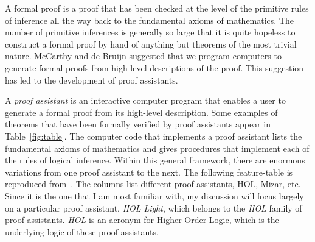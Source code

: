\documentclass{llncs}
\begin{document}
A formal proof is a proof that has been checked at the level of the
primitive rules of inference all the way back to the fundamental
axioms of mathematics.  The number of primitive inferences is
generally so large that it is quite hopeless to construct a formal
proof by hand of anything but theorems of the most trivial nature.
McCarthy and de Bruijn suggested that we program computers to generate
formal proofs from high-level descriptions of the proof.  This
suggestion has led to the development of proof assistants.


A {\it proof assistant} is an interactive computer program that enables a user to
generate a formal proof from its high-level description. 
Some examples of theorems that have been formally verified by proof assistants appear
in Table~\ref{fig:table}.
 The computer code
that implements a proof assistant lists the fundamental axioms
of mathematics and gives procedures that implement each of the rules of logical
inference.  Within this general framework, there are enormous variations
from one proof assistant to the next. The following feature-table is
reproduced from~\cite{wiedijk:17}.  The columns list different proof
assistants, HOL, Mizar, etc.  Since it is the one that I am most familiar with,
my discussion will focus largely on a particular
proof assistant, {\it HOL Light}, which belongs to the {\it HOL} family of
proof assistants. {\it HOL} is an acronym for Higher-Order Logic, which is the underlying
logic of these proof assistants.
\end{document}
